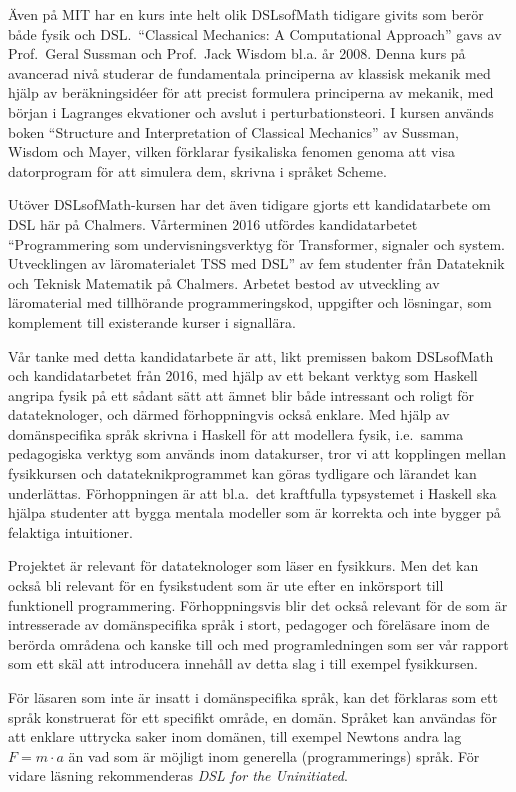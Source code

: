 \documentclass[12pt,a4paper]{article}
\begin{document}
Även på MIT har en kurs inte helt olik DSLsofMath tidigare givits som berör både
fysik och DSL.\ ``Classical Mechanics: A Computational Approach'' gavs av
Prof.\ Geral Sussman och Prof.\ Jack Wisdom bl.a. år
2008.\cite{classical-mechanics-course-mit-2008}
Denna kurs på avancerad nivå studerar de fundamentala principerna av klassisk
mekanik med hjälp av beräkningsidéer för att precist formulera principerna av
mekanik, med början i Lagranges ekvationer och avslut i
perturbationsteori. I kursen används boken ``Structure and
Interpretation of Classical Mechanics'' av Sussman, Wisdom och Mayer,
vilken förklarar fysikaliska fenomen genoma att visa datorprogram för att
simulera dem, skrivna i språket Scheme.\cite{SICM}

Utöver DSLsofMath-kursen har det även tidigare gjorts ett kandidatarbete om DSL 
här på Chalmers. Vårterminen 2016 utfördes kandidatarbetet
``Programmering som undervisningsverktyg för Transformer, signaler och
system. Utvecklingen av läromaterialet TSS med DSL'' av fem studenter
från Datateknik och Teknisk Matematik på Chalmers. Arbetet bestod av
utveckling av läromaterial med tillhörande programmeringskod,
uppgifter och lösningar, som komplement till existerande kurser i
signallära.\cite{kandidat2016}

Vår tanke med detta kandidatarbete är att, likt premissen bakom DSLsofMath
och kandidatarbetet från 2016, med hjälp av ett bekant verktyg
som Haskell angripa fysik på ett sådant sätt att ämnet blir både
intressant och roligt för datateknologer, och därmed förhoppningvis
också enklare. Med hjälp av domänspecifika språk skrivna i Haskell för att
modellera fysik, i.e.\ samma pedagogiska verktyg som används inom
datakurser, tror vi att kopplingen mellan fysikkursen och
datateknikprogrammet kan göras tydligare och lärandet kan underlättas.
Förhoppningen är att bl.a.\ det kraftfulla typsystemet i Haskell ska
hjälpa studenter att bygga mentala modeller som är korrekta och inte
bygger på felaktiga intuitioner.

Projektet är relevant för datateknologer som läser en fysikkurs. Men
det kan också bli relevant för en fysikstudent som är ute efter en
inkörsport till funktionell programmering. Förhoppningsvis blir det
också relevant för de som är intresserade av domänspecifika språk i
stort, pedagoger och föreläsare inom de berörda områdena och kanske
till och med programledningen som ser vår rapport som ett skäl att
introducera innehåll av detta slag i till exempel fysikkursen.

För läsaren som inte är insatt i domänspecifika språk, kan det
förklaras som ett språk konstruerat för ett specifikt område, en
domän. Språket kan användas för att enklare uttrycka saker inom
domänen, till exempel Newtons andra lag $F=m \cdot a$ än vad som är
möjligt inom generella (programmerings) språk. För vidare läsning
rekommenderas \textit{DSL for the Uninitiated}.\cite{DSLU}
\end{document}
